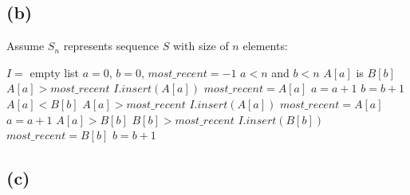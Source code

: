     \subsection{(b)}
    Assume $S_n$ represents sequence $S$ with size of $n$ elements:
    \begin{codebox}
        \li $I =$ empty list
        \li $a = 0$, $b = 0$, $most\_recent = -1$
        \li \While $a < n$ and $b<n$
            \Do
                \li \If $A[a]$ is $B[b]$
                \Then
                    \li \If $A[a] > most\_recent$
                    \Then
                        \li $I.insert(A[a])$
                        \li $most\_recent = A[a]$
                    \End
                    \li $a = a + 1$
                    \li $b = b + 1$
                \li \ElseIf $A[a] < B[b]$
                \Then
                    \li \If $A[a] > most\_recent$
                    \Then
                        \li $I.insert(A[a])$
                        \li $most\_recent = A[a]$
                    \End
                    \li $a = a + 1$
                \li \ElseIf $A[a] > B[b]$
                \Then
                \li \If $B[b] > most\_recent$
                    \Then
                        \li $I.insert(B[b])$
                        \li $most\_recent = B[b]$
                    \End
                    \li $b = b + 1$
                \End 
            \End
    \end{codebox}
    \subsection{(c)}